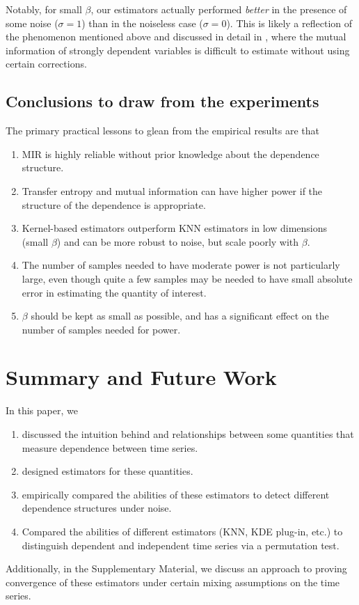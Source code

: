 \documentclass{article} %
\begin{document}
Notably, for small $\beta$, our estimators actually performed \emph{better} in
the presence of some noise ($\sigma = 1$) than in the noiseless case
($\sigma = 0$). This is likely a reflection of the phenomenon mentioned above
and discussed in detail in \cite{gao2014stronglyDependent}, where the mutual
information of strongly dependent variables is difficult to estimate without
using certain corrections.

\subsection{Conclusions to draw from the experiments}
The primary practical lessons to glean from the empirical results are that
\begin{enumerate}
\item MIR is highly reliable without prior knowledge about the dependence
structure.
\item Transfer entropy and mutual information can have higher power
if the structure of the dependence is appropriate.
\item Kernel-based estimators outperform KNN estimators in low dimensions
(small $\beta$) and can be more robust to noise, but scale poorly with $\beta$.
\item The number of samples needed to have moderate power is not particularly
large, even though quite a few samples may be needed to have small absolute
error in estimating the quantity of interest.
\item $\beta$ should be kept as small as possible, and has a significant effect
on the number of samples needed for power.
\end{enumerate}

\section{Summary and Future Work}
In this paper, we
\begin{enumerate}
\item discussed the intuition behind and relationships between some quantities
that measure dependence between time series.
\item designed estimators for these quantities.
\item empirically compared the abilities of these estimators to detect
different dependence structures under noise.
\item Compared the abilities of different estimators (KNN, KDE plug-in, etc.)
to distinguish dependent and independent time series via a permutation test.
\end{enumerate}
Additionally, in the Supplementary Material, we discuss an approach to proving
convergence of these estimators under certain mixing assumptions on the time
series.
\end{document}
